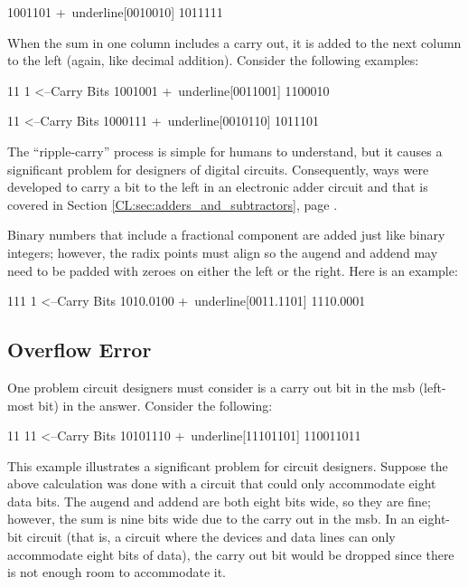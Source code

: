 \begin{binDisp}[commandchars=~\[\]]
      1001101
     +~underline[0010010]
      1011111
\end{binDisp}

When the sum in one column includes a carry out, it is added to the next column to the left (again, like decimal addition). Consider the following examples:

\begin{binDisp}[commandchars=~\[\]]
       11  1  <--Carry Bits
      1001001
     +~underline[0011001]
      1100010
\end{binDisp}

\begin{binDisp}[commandchars=~\[\], samepage=true]
         11   <--Carry Bits
      1000111
     +~underline[0010110]
      1011101
\end{binDisp}

The ``ripple-carry'' process is simple for humans to understand, but it causes a significant problem for designers of digital circuits. Consequently, ways were developed to carry a bit to the left in an electronic adder circuit and that is covered in Section \ref{CL:sec:adders_and_subtractors}, page \pageref{CL:sec:adders_and_subtractors}.

Binary numbers that include a fractional component are added just like binary integers; however, the radix points must align so the augend and addend may need to be padded with zeroes on either the left or the right. Here is an example: 

\begin{binDisp}[commandchars=~\[\]]
       111 1    <--Carry Bits
      1010.0100
     +~underline[0011.1101]
      1110.0001
\end{binDisp}

\subsection{Overflow Error}
\label{MO:sub:overflow_error}

One problem circuit designers must consider is a carry out bit in the \gls{msb} (left-most bit) in the answer. Consider the following:

\begin{binDisp}[commandchars=~\[\]]
      11 11    <--Carry Bits
      10101110
     +~underline[11101101]
     110011011
\end{binDisp}

This example illustrates a significant problem for circuit designers. Suppose the above calculation was done with a circuit that could only accommodate eight data bits. The augend and addend are both eight bits wide, so they are fine; however, the sum is nine bits wide due to the carry out in the \gls{msb}. In an eight-bit circuit (that is, a circuit where the devices and data lines can only accommodate eight bits of data), the carry out bit would be dropped since there is not enough room to accommodate it.

